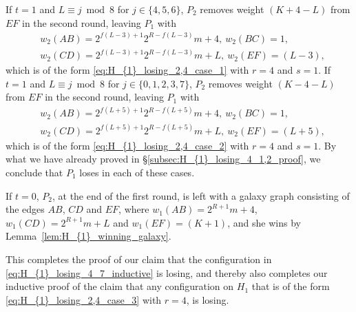 \documentclass[11pt,reqno]{amsart}
\theoremstyle{definition}
\theoremstyle{definition}
\begin{document}
\begin{enumerate}
If $t=1$ and $L \equiv j \bmod 8$ for $j \in \{4,5,6\}$, $P_{2}$ removes weight $(K+4-L)$ from $EF$ in the second round, leaving $P_{1}$ with
\begin{align}
{}&w_{2}(AB)=2^{f(L-3)+1}2^{R-f(L-3)}m+4,\ w_{2}(BC)=1,\nonumber\\
{}&w_{2}(CD)=2^{f(L-3)+1}2^{R-f(L-3)}m+L,\ w_{2}(EF)=(L-3),\nonumber
\end{align}
which is of the form \eqref{eq:H_{1}_losing_2,4_case_1} with $r=4$ and $s=1$. If $t=1$ and $L \equiv j \bmod 8$ for $j \in \{0,1,2,3,7\}$, $P_{2}$ removes weight $(K-4-L)$ from $EF$ in the second round, leaving $P_{1}$ with
\begin{align}
{}&w_{2}(AB)=2^{f(L+5)+1}2^{R-f(L+5)}m+4,\ w_{2}(BC)=1,\nonumber\\
{}&w_{2}(CD)=2^{f(L+5)+1}2^{R-f(L+5)}m+L,\ w_{2}(EF)=(L+5),\nonumber
\end{align}
which is of the form \eqref{eq:H_{1}_losing_2,4_case_2} with $r=4$ and $s=1$. By what we have already proved in \S\ref{subsec:H_{1}_losing_4_1,2_proof}, we conclude that $P_{1}$ loses in each of these cases.

If $t=0$, $P_{2}$, at the end of the first round, is left with a galaxy graph consisting of the edges $AB$, $CD$ and $EF$, where $w_{1}(AB)=2^{R+1}m+4$, $w_{1}(CD)=2^{R+1}m+L$ and $w_{1}(EF)=(K+1)$, and she wins by Lemma~\ref{lem:H_{1}_winning_galaxy}.
\end{enumerate}
This completes the proof of our claim that the configuration in \eqref{eq:H_{1}_losing_4_7_inductive} is losing, and thereby also completes our inductive proof of the claim that any configuration on $H_{1}$ that is of the form \eqref{eq:H_{1}_losing_2,4_case_3} with $r=4$, is losing.







\end{document}
